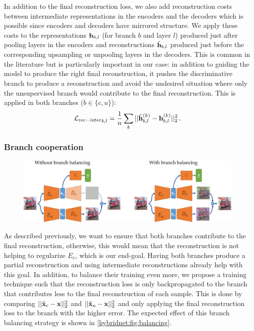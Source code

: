 In addition to the final reconstruction loss, we also add reconstruction costs between intermediate representations in the encoders and the decoders which is possible since encoders and decoders have mirrored structure. We apply these costs to the representations $\mathbf{h}_{b,l}$ (for branch $b$ and layer $l$) produced just after pooling layers in the encoders and reconstructions $\hat{\mathbf{h}}_{b,l}$ produced just before the corresponding upsampling or unpooling layers in the decoders. This is common in the literature \citep{Zhao2016a,Zhang2016a,Rasmus2015} but is particularly important in our case: in addition to guiding the model to produce the right final reconstruction, it pushes the discriminative branch to produce a reconstruction and avoid the undesired situation where only the unsupervised branch would contribute to the final reconstruction. This is applied in both branches ($b \in \{c,u\}$):
\begin{equation}
	{\mathcal L_\mathrm{rec-inter}}_{b,l} = \frac{1}{n} \sum_k ||\hat{\mathbf{h}}_{b,l}^{(k)} - \mathbf{h}_{b,l}^{(k)}||_2^2\,.
\end{equation}


\subsubsection{Branch cooperation}

\begin{figure}[t]
	\centering
	\includegraphics[width=\textwidth]{images/hybridnet_balacing}
    \label{hybridnet:fig:balancing}
\end{figure}

As described previously, we want to ensure that both branches contribute to the final reconstruction, otherwise, this would mean that the reconstruction is not helping to regularize $E_c$, which is our end-goal. Having both branches produce a partial reconstruction and using intermediate reconstructions already help with this goal. In addition, to balance their training even more, we propose a training technique such that the reconstruction loss is only backpropagated to the branch that contributes less to the final reconstruction of each sample. This is done by comparing $||\hat{\mathbf{x}}_c - \mathbf{x}||_2^2$ and $||\hat{\mathbf{x}}_u - \mathbf{x}||_2^2$ and only applying the final reconstruction loss to the branch with the higher error. The expected effect of this branch balancing strategy is shown in \autoref{hybridnet:fig:balancing}.

